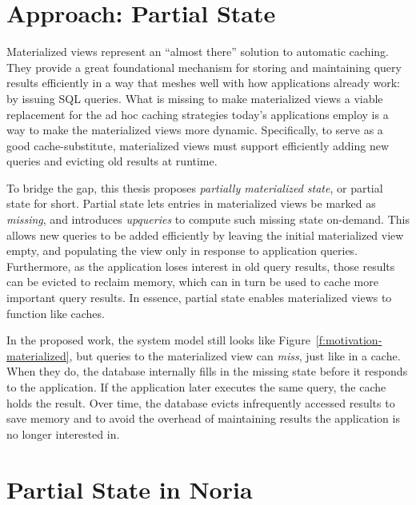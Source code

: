\section{Approach: Partial State}

Materialized views represent an ``almost there'' solution to automatic caching.
They provide a great foundational mechanism for storing and maintaining query
results efficiently in a way that meshes well with how applications already
work: by issuing SQL queries. What is missing to make materialized views a
viable replacement for the ad hoc caching strategies today's applications employ
is a way to make the materialized views more dynamic. Specifically, to serve as
a good cache-substitute, materialized views must support efficiently adding new
queries and evicting old results at runtime.

To bridge the gap, this thesis proposes \textit{partially materialized state},
or partial state for short. Partial state lets entries in materialized views be
marked as \textit{missing}, and introduces \textit{upqueries} to compute such
missing state on-demand. This allows new queries to be added efficiently by
leaving the initial materialized view empty, and populating the view only in
response to application queries. Furthermore, as the application loses interest
in old query results, those results can be evicted to reclaim memory, which can
in turn be used to cache more important query results. In essence, partial state
enables materialized views to function like caches.

In the proposed work, the system model still looks like
Figure~\vref{f:motivation-materialized}, but queries to the materialized view
can \emph{miss}, just like in a cache. When they do, the database internally
fills in the missing state before it responds to the application. If the
application later executes the same query, the cache holds the result. Over
time, the database evicts infrequently accessed results to save memory and to
avoid the overhead of maintaining results the application is no longer
interested in.

\section{Partial State in Noria}

